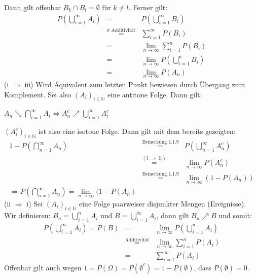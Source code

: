 \documentclass[10pt,a4paper]{report}
\numberwithin{equation}{section}
\numberwithin{figure}{section}
\theoremstyle{plain}
\theoremstyle{definition}
\theoremstyle{plain}
\theoremstyle{definition}
\theoremstyle{remark}
\theoremstyle{plain}
\theoremstyle{plain}
\theoremstyle{plain}
\newcommand{\1}{ \mathbb{1} } %
\begin{document}
Dann gilt offenbar $B_k\cap B_l=\emptyset$ für $k\neq l$. Ferner gilt:
\begin{eqnarray*}
P\left(\bigcup\limits_{i=1}^\infty A_i\right)&=&P\left(\bigcup\limits_{i=1}^\infty B_i\right)\\
&\overset{\sigma \text{ Additivität}}{=}&\sum\limits_{i=1}^\infty P(B_i)\\
&=& \lim\limits_{n \to \infty}\sum\limits_{i=1}^n P(B_i)\\ 
&=& \lim\limits_{n \to \infty} P\left(\bigcup\limits_{i=1}^n B_i\right)\\
&=& \lim\limits_{n \to \infty} P(A_n)
\end{eqnarray*}
(i $\Rightarrow$ iii) Wird Äquivalent zum letzten Punkt bewiesen durch Übergang zum Komplement. Sei also $(A_i)_{i \in \mathbb{N}}$ eine antitone Folge. Dann gilt:\begin{center}
$A_n \searrow \bigcap\limits_{i=1}^\infty A_i \Leftrightarrow A_n^c \nearrow \bigcup\limits_{i=1}^\infty A_i^c$
\end{center}
$(A_i^c)_{i \in \mathbb{N}}$ ist also eine isotone Folge. Dann gilt mit dem bereits gezeigten:
\begin{eqnarray*}
1-P\left(\bigcap\limits_{n=1}^\infty A_n\right)&\overset{\text{Bemerkung 1.1.9}}{=}&P\left(\bigcup\limits_{n=1}^\infty A_n^c\right)\\
&\overset{(\text{i } \Rightarrow \text{ ii})}{=}&\lim\limits_{n \to \infty}P(A_n^c)\\
&\overset{\text{Bemerkung 1.1.9}}{=}&\lim\limits_{n \to \infty}(1-P(A_n))\\
\Rightarrow P\left(\bigcap\limits_{n=1}^\infty A_n\right)=\lim\limits_{n \to \infty}(1-P(A_n)
\end{eqnarray*} 
(ii $\Rightarrow$ i) Sei $(A_i)_{i\in \mathbb{N}}$ eine Folge paarweiser disjunkter Mengen (Ereignisse). Wir definieren: $B_n=\bigcup\limits_{i=1}^n A_i$ und $B=\bigcup\limits_{i=1}^\infty A_i$, dann gilt $B_n \nearrow B$ und somit:
\begin{eqnarray*}
P\left(\bigcup\limits_{i=1}^\infty A_i\right)=P(B)&=&\lim\limits_{n \to \infty}P\left(\bigcup\limits_{i=1}^n A_i\right)\\
&\overset{\text{Additivität}}{=}& \lim\limits_{n \to \infty}\sum\limits_{i=1}^n P(A_i)\\
&=& \sum\limits_{i=1}^\infty P(A_i)
\end{eqnarray*} 
Offenbar gilt auch wegen $1=P(\Omega)=P(\emptyset^c)=1-P(\emptyset)$, dass $P(\emptyset)=0$.\\\\
\end{document}
